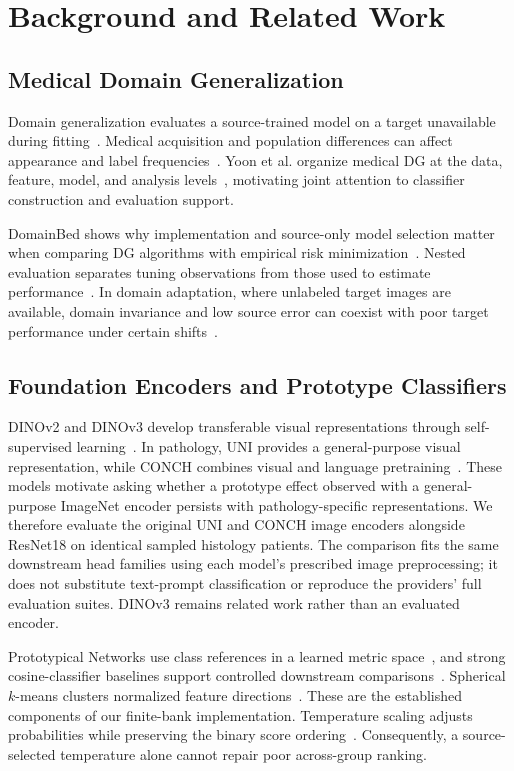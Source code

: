 \section{Background and Related Work}
\label{sec:background}

\subsection{Medical Domain Generalization}
Domain generalization evaluates a source-trained model on a target unavailable during fitting~\cite{gulrajani2021domainbed}. Medical acquisition and population differences can affect appearance and label frequencies~\cite{zech2018generalization,yoon2024medicaldg}. Yoon et al. organize medical DG at the data, feature, model, and analysis levels~\cite{yoon2024medicaldg}, motivating joint attention to classifier construction and evaluation support.

DomainBed shows why implementation and source-only model selection matter when comparing DG algorithms with empirical risk minimization~\cite{gulrajani2021domainbed}. Nested evaluation separates tuning observations from those used to estimate performance~\cite{varma2006bias}. In domain adaptation, where unlabeled target images are available, domain invariance and low source error can coexist with poor target performance under certain shifts~\cite{zhao2019invariant}.

\subsection{Foundation Encoders and Prototype Classifiers}
DINOv2 and DINOv3 develop transferable visual representations through self-supervised learning~\cite{oquab2024dinov2,simeoni2025dinov3}. In pathology, UNI provides a general-purpose visual representation, while CONCH combines visual and language pretraining~\cite{chen2024uni,lu2024conch}. These models motivate asking whether a prototype effect observed with a general-purpose ImageNet encoder persists with pathology-specific representations. We therefore evaluate the original UNI and CONCH image encoders alongside ResNet18 on identical sampled histology patients. The comparison fits the same downstream head families using each model's prescribed image preprocessing; it does not substitute text-prompt classification or reproduce the providers' full evaluation suites. DINOv3 remains related work rather than an evaluated encoder.

Prototypical Networks use class references in a learned metric space~\cite{snell2017prototypical}, and strong cosine-classifier baselines support controlled downstream comparisons~\cite{chen2019closer}. Spherical $k$-means clusters normalized feature directions~\cite{dhillon2001spherical}. These are the established components of our finite-bank implementation. Temperature scaling adjusts probabilities while preserving the binary score ordering~\cite{guo2017calibration}. Consequently, a source-selected temperature alone cannot repair poor across-group ranking.

